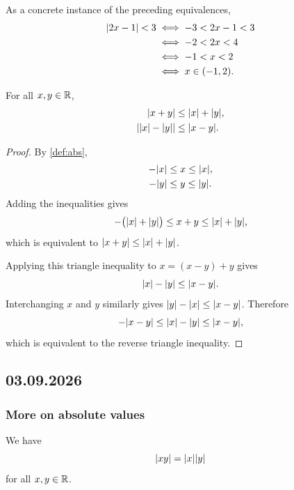 \documentclass[12pt, a4paper]{article}
\begin{document}
\begin{example}
  As a concrete instance of the preceding equivalences,
  \begin{align*}
    \lvert2x-1\rvert<3
    &\iff -3<2x-1<3 \\
    &\iff -2<2x<4 \\
    &\iff -1<x<2 \\
    &\iff x\in(-1,2).
  \end{align*}
\end{example}

\begin{theorem}
  For all \(x,y\in\mathbb{R}\),
  \begin{align*}
    \lvert x+y\rvert &\leq \lvert x\rvert+\lvert y\rvert, \\
    \lvert\lvert x\rvert-\lvert y\rvert\rvert &\leq \lvert x-y\rvert.
  \end{align*}
\end{theorem}

\begin{proof}
  By \cref{def:abs},
  \begin{align*}
    -\lvert x\rvert&\leq x\leq\lvert x\rvert, \\
    -\lvert y\rvert&\leq y\leq\lvert y\rvert.
  \end{align*}
  Adding the inequalities gives
  \[
    -\bigl(\lvert x\rvert+\lvert y\rvert\bigr)
    \leq x+y
    \leq \lvert x\rvert+\lvert y\rvert,
  \]
  which is equivalent to \(\lvert x+y\rvert\leq\lvert x\rvert+\lvert y\rvert\).

  Applying this triangle inequality to \(x=(x-y)+y\) gives
  \[
    \lvert x\rvert-\lvert y\rvert\leq\lvert x-y\rvert.
  \]
  Interchanging \(x\) and \(y\) similarly gives
  \(\lvert y\rvert-\lvert x\rvert\leq\lvert x-y\rvert\). Therefore
  \[
    -\lvert x-y\rvert\leq\lvert x\rvert-\lvert y\rvert\leq\lvert x-y\rvert,
  \]
  which is equivalent to the reverse triangle inequality.
\end{proof}

\subsection{03.09.2026}

\subsubsection{More on absolute values}

\begin{theorem}
  We have
  \[
    \lvert xy\rvert = \lvert x\rvert\lvert y\rvert
  \]
  for all \(x, y \in \mathbb{R}\).
\end{theorem}
\end{document}
